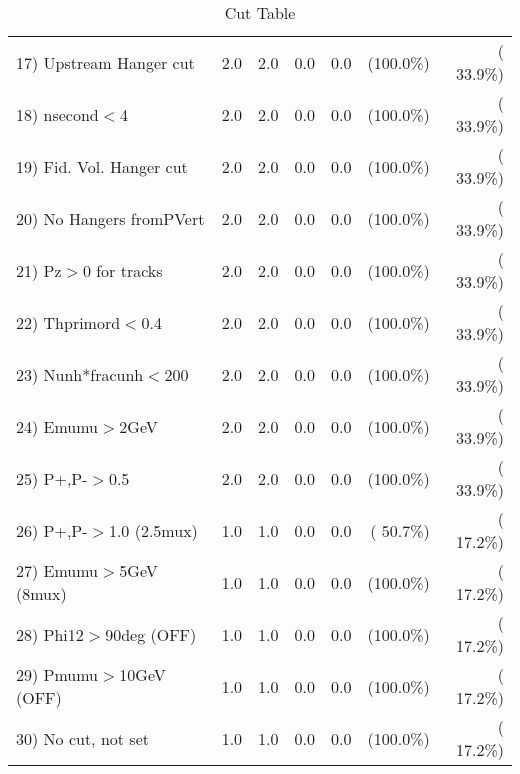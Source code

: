 \begin{table}[h!]
\begin{tabular}{||l||r|r|r|r|r|r||}
 17) Upstream Hanger cut  &          2.0 &          2.0 &          0.0 &          0.0 & (100.0\%) & ( 33.9\%) \\
 18) nsecond$<$4          &          2.0 &          2.0 &          0.0 &          0.0 & (100.0\%) & ( 33.9\%) \\
 19) Fid. Vol. Hanger cut &          2.0 &          2.0 &          0.0 &          0.0 & (100.0\%) & ( 33.9\%) \\
 20) No Hangers fromPVert &          2.0 &          2.0 &          0.0 &          0.0 & (100.0\%) & ( 33.9\%) \\
 21) Pz$>$0 for tracks    &          2.0 &          2.0 &          0.0 &          0.0 & (100.0\%) & ( 33.9\%) \\
 22) Thprimord$<$0.4      &          2.0 &          2.0 &          0.0 &          0.0 & (100.0\%) & ( 33.9\%) \\
 23) Nunh*fracunh$<$200   &          2.0 &          2.0 &          0.0 &          0.0 & (100.0\%) & ( 33.9\%) \\
 24) Emumu$>$2GeV         &          2.0 &          2.0 &          0.0 &          0.0 & (100.0\%) & ( 33.9\%) \\
 25) P+,P-$>$0.5          &          2.0 &          2.0 &          0.0 &          0.0 & (100.0\%) & ( 33.9\%) \\
 26) P+,P-$>$1.0 (2.5mux) &          1.0 &          1.0 &          0.0 &          0.0 & ( 50.7\%) & ( 17.2\%) \\
 27) Emumu$>$5GeV  (8mux) &          1.0 &          1.0 &          0.0 &          0.0 & (100.0\%) & ( 17.2\%) \\
 28) Phi12$>$90deg  (OFF) &          1.0 &          1.0 &          0.0 &          0.0 & (100.0\%) & ( 17.2\%) \\
 29) Pmumu$>$10GeV  (OFF) &          1.0 &          1.0 &          0.0 &          0.0 & (100.0\%) & ( 17.2\%) \\
 30) No cut, not set      &          1.0 &          1.0 &          0.0 &          0.0 & (100.0\%) & ( 17.2\%) \\
 \hline
 \hline
 \end{tabular}
 \caption{Cut Table           }
 \label{tab-cutheavy_neutrino_1.000}
 \end{table}

